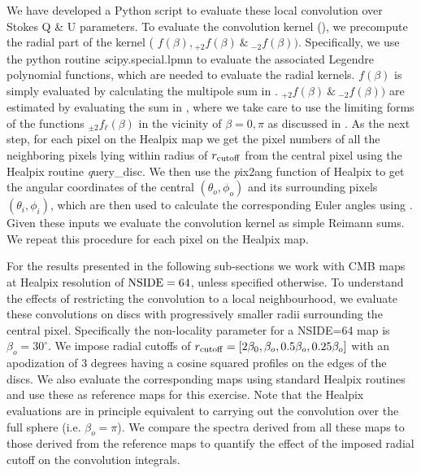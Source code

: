 We have developed a Python script to evaluate these local convolution over Stokes Q \& U parameters. To evaluate the convolution kernel (), we precompute the radial part of the kernel ( $f(\beta), {}_{+2}f(\beta) ~\&~ {}_{-2}f(\beta))$. Specifically, we use the python routine {\textit scipy.special.lpmn} to evaluate the associated Legendre polynomial functions, which are needed to evaluate the radial kernels. $f(\beta)$ is simply evaluated by calculating the multipole sum in . ${}_{+2}f(\beta) ~\&~ {}_{-2}f(\beta))$ are estimated by evaluating the sum in , where we take care to use the limiting forms of the functions ${}_{\pm 2}f_{\ell}(\beta)$ in the vicinity of $\beta=0,\pi$ as discussed in . As the next step, for each pixel on the Healpix map we get the pixel numbers of all the neighboring pixels lying within radius of $r_{\rm cutoff}$ from the central pixel using the Healpix routine {\textit query\_disc}. We then use the {\textit pix2ang} function of Healpix to get the angular coordinates of the central $(\theta_o,\phi_o)$ and its surrounding pixels $(\theta_i,\phi_i)$, which are then used to calculate the corresponding Euler angles using . Given these  inputs we evaluate the convolution kernel as simple Reimann sums. We repeat this procedure for each pixel on the Healpix map. 

For the results presented in the following sub-sections we work with CMB maps at Healpix resolution of ${\rm NSIDE}=64$, unless specified otherwise.  To understand the effects of restricting the convolution to a local neighbourhood, we evaluate these convolutions on discs with progressively smaller radii surrounding the central pixel.  Specifically the non-locality parameter for a NSIDE=64 map is $\beta_o=30^{\circ}$. We impose radial cutoffs of $r_{\rm cutoff}=[2\beta_0,\beta_o,0.5\beta_o,0.25\beta_o]$ with an apodization of 3 degrees having a cosine squared profiles on the edges of the discs. We also evaluate the corresponding maps using standard Healpix routines and use these as reference maps for this exercise. Note that the Healpix evaluations are in principle equivalent to carrying out the convolution over the full sphere (i.e. $\beta_o=\pi$).  We compare the spectra derived from all these maps to those derived from the reference maps to quantify the effect of the imposed radial cutoff on the convolution integrals.

